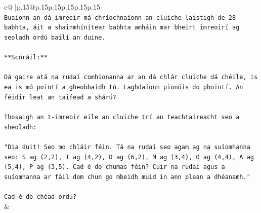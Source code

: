 \documentclass{article}
\begin{document}
{\begin{supertabular}{c@{$\;$}|p{.15\linewidth}@{}p{.15\linewidth}p{.15\linewidth}p{.15\linewidth}p{.15\linewidth}p{.15\linewidth}}
{{{\\ 
\texttt{Buaíonn an dá imreoir má chríochnaíonn an cluiche laistigh de 28 babhta, áit a shainmhínítear babhta amháin mar bheirt imreoirí ag seoladh ordú bailí an duine.} \\
\\ 
\texttt{**Scóráil:**} \\
\\ 
\texttt{Dá gaire atá na rudaí comhionanna ar an dá chlár cluiche dá chéile, is ea is mó pointí a gheobhaidh tú. Laghdaíonn pionóis do phointí. An féidir leat an taifead a shárú?} \\
\\ 
\texttt{Thosaigh an t{-}imreoir eile an cluiche trí an teachtaireacht seo a sheoladh:} \\
\\ 
\texttt{"Dia duit! Seo mo chláir féin. Tá na rudaí seo agam ag na suíomhanna seo: S ag (2,2), T ag (4,2), D ag (6,2), M ag (3,4), O ag (4,4), A ag (5,4), P ag (3,5). Cad é do chumas féin? Cuir na rudaí agus a suíomhanna ar fáil dom chun go mbeidh muid in ann plean a dhéanamh."} \\
\\ 
\texttt{Cad é do chéad ordú?} \\
            }
        }
    }
    & \\ \\


\end{supertabular}}
\end{document}
